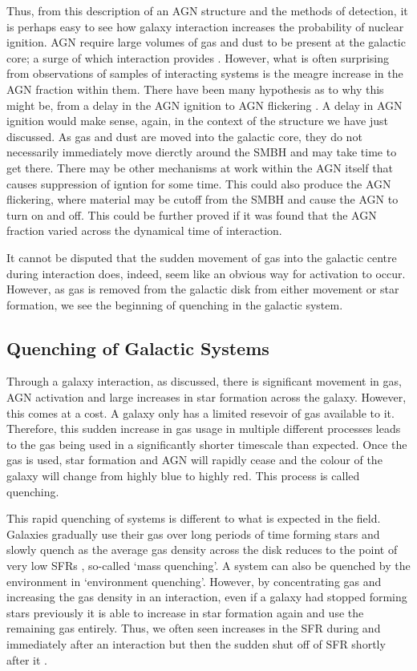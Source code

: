 Thus, from this description of an AGN structure and the methods of detection, it is perhaps easy to see how galaxy interaction increases the probability of nuclear ignition. AGN require large volumes of gas and dust to be present at the galactic core; a surge of which interaction provides \citep[][provides an excellent summary of this process from the point of view of simulations]{2008ApJS..175..356H}. However, what is often surprising from observations of samples of interacting systems is the meagre increase in the AGN fraction within them. There have been many hypothesis as to why this might be, from a delay in the AGN ignition \citep{2011MNRAS.418.2043E} to AGN flickering \citep{2015MNRAS.451.2517S}. A delay in AGN ignition would make sense, again, in the context of the structure we have just discussed. As gas and dust are moved into the galactic core, they do not necessarily immediately move dierctly around the SMBH and may take time to get there. There may be other mechanisms at work within the AGN itself that causes suppression of igntion for some time. This could also produce the AGN flickering, where material may be cutoff from the SMBH and cause the AGN to turn on and off. This could be further proved if it was found that the AGN fraction varied across the dynamical time of interaction.

It cannot be disputed that the sudden movement of gas into the galactic centre during interaction does, indeed, seem like an obvious way for activation to occur. However, as gas is removed from the galactic disk from either movement or star formation, we see the beginning of quenching in the galactic system. 

\subsection{Quenching of Galactic Systems}
\noindent Through a galaxy interaction, as discussed, there is significant movement in gas, AGN activation and large increases in star formation across the galaxy. However, this comes at a cost. A galaxy only has a limited resevoir of gas available to it. Therefore, this sudden increase in gas usage in multiple different processes leads to the gas being used in a significantly shorter timescale than expected. Once the gas is used, star formation and AGN will rapidly cease and the colour of the galaxy will change from highly blue to highly red. This process is called quenching.

This rapid quenching of systems is different to what is expected in the field. Galaxies gradually use their gas over long periods of time forming stars and slowly quench as the average gas density across the disk reduces to the point of very low SFRs \citep{2010ApJ...721..193P}, so-called `mass quenching'. A system can also be quenched by the environment in `environment quenching'. However, by concentrating gas and increasing the gas density in an interaction, even if a galaxy had stopped forming stars previously it is able to increase in star formation again and use the remaining gas entirely. Thus, we often seen increases in the SFR during and immediately after an interaction but then the sudden shut off of SFR shortly after it \citep{2022MNRAS.517L..92E}.


